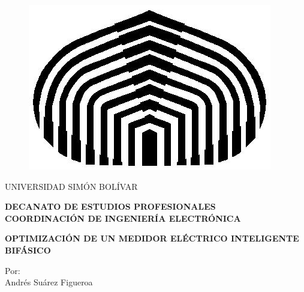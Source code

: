 \thispagestyle{empty}
    \begin{figure}[!ht]
        \begin{center}
            \includegraphics[scale=0.3]{../Imagenes/cebolla.jpg}
        \end{center}
    \end{figure}

    \vspace{-1.cm}

    \begin{center}
		\begin{large}
			UNIVERSIDAD SIMÓN BOLÍVAR\\
		\end{large}
    		\textbf{DECANATO DE ESTUDIOS PROFESIONALES}\\
	  		\textbf{COORDINACIÓN DE INGENIERÍA ELECTRÓNICA}\\

    \end{center}



    \vspace{4cm}
    \begin{center}
    \textbf{OPTIMIZACIÓN DE UN MEDIDOR ELÉCTRICO INTELIGENTE BIFÁSICO}\\
    \end{center}

    \vspace{3cm}
    \begin{center}
        Por:\\
        Andrés Suárez Figueroa
    \end{center}


